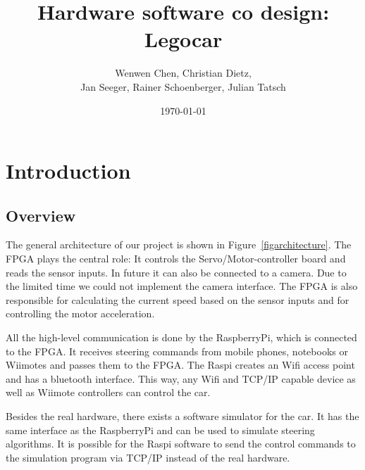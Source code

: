\documentclass[a4paper
               ,10pt
               ,DIV=10 %
               ,BCOR=0.3cm
               ,pagesize %
               ,headings=small
               ,bibtotoc
               ]
               {scrartcl}
\title{Hardware software co design: Legocar}%
\author{Wenwen Chen, Christian Dietz, \\
	Jan Seeger, Rainer Schoenberger, Julian Tatsch
}
\date{\today}
\begin{document}
\maketitle

\begin{abstract}
\end{abstract}
\tableofcontents
\section{Introduction}
\subsection{Overview}

The general architecture of our project is shown in Figure~\ref{figarchitecture}.
The FPGA plays the central role:
It controls the Servo/Motor-controller board and reads the sensor inputs.
In future it can also be connected to a camera.
Due to the limited time we could not implement the camera interface.
The FPGA is also responsible for calculating the current speed based on the sensor inputs and for controlling the motor acceleration.

All the high-level communication is done by the RaspberryPi, which is connected to the FPGA.
It receives steering commands from mobile phones, notebooks or Wiimotes and passes them to the FPGA.
The Raspi creates an Wifi access point and has a bluetooth interface.
This way, any Wifi and TCP/IP capable device as well as Wiimote controllers can control the car.

Besides the real hardware, there exists a software simulator for the car.
It has the same interface as the RaspberryPi and can be used to simulate steering algorithms.
It is possible for the Raspi software to send the control commands to the simulation program via TCP/IP instead of the real hardware.
\end{document}

